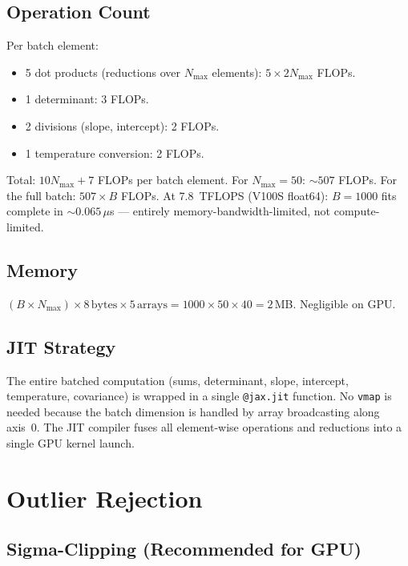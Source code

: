 \documentclass[11pt]{article}
\begin{document}
\subsection{Operation Count}

Per batch element:
\begin{itemize}
  \item 5 dot products (reductions over $N_{\max}$ elements): $5 \times 2N_{\max}$ FLOPs.
  \item 1 determinant: 3 FLOPs.
  \item 2 divisions (slope, intercept): 2 FLOPs.
  \item 1 temperature conversion: 2 FLOPs.
\end{itemize}
Total: $10N_{\max} + 7$ FLOPs per batch element. For $N_{\max} = 50$:
$\sim 507$ FLOPs. For the full batch: $507 \times B$ FLOPs.
At 7.8~TFLOPS (V100S float64): $B = 1000$ fits complete in $\sim 0.065\,\mu$s ---
entirely memory-bandwidth-limited, not compute-limited.

\subsection{Memory}

$(B \times N_{\max}) \times 8\,\text{bytes} \times 5\,\text{arrays}
= 1000 \times 50 \times 40 = 2$\,MB. Negligible on GPU.

\subsection{JIT Strategy}

The entire batched computation (sums, determinant, slope, intercept, temperature,
covariance) is wrapped in a single \texttt{@jax.jit} function. No \texttt{vmap}
is needed because the batch dimension is handled by array broadcasting along axis~0.
The JIT compiler fuses all element-wise operations and reductions into a single
GPU kernel launch.


\section{Outlier Rejection}
\label{sec:outliers}

\subsection{Sigma-Clipping (Recommended for GPU)}
\end{document}
